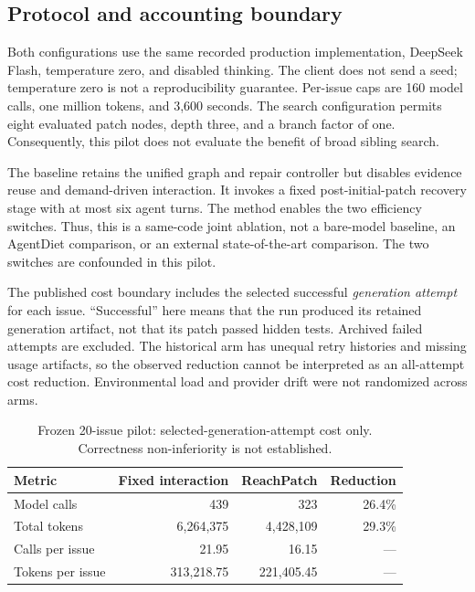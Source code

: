 \documentclass[acmsmall,screen,review,anonymous]{acmart}
\newcommand{\system}{ReachPatch}
\begin{document}
\subsection{Protocol and accounting boundary}
Both configurations use the same recorded production implementation, DeepSeek Flash, temperature zero, and disabled thinking. The client does not send a seed; temperature zero is not a reproducibility guarantee. Per-issue caps are 160 model calls, one million tokens, and 3,600 seconds. The search configuration permits eight evaluated patch nodes, depth three, and a branch factor of one. Consequently, this pilot does not evaluate the benefit of broad sibling search.

The baseline retains the unified graph and repair controller but disables evidence reuse and demand-driven interaction. It invokes a fixed post-initial-patch recovery stage with at most six agent turns. The method enables the two efficiency switches. Thus, this is a same-code joint ablation, not a bare-model baseline, an AgentDiet comparison, or an external state-of-the-art comparison. The two switches are confounded in this pilot.

The published cost boundary includes the selected successful \emph{generation attempt} for each issue. ``Successful'' here means that the run produced its retained generation artifact, not that its patch passed hidden tests. Archived failed attempts are excluded. The historical arm has unequal retry histories and missing usage artifacts, so the observed reduction cannot be interpreted as an all-attempt cost reduction. Environmental load and provider drift were not randomized across arms.

\begin{table}[t]
\caption{Frozen 20-issue pilot: selected-generation-attempt cost only. Correctness non-inferiority is not established.}
\label{tab:pilot}
\begin{tabular}{@{}lrrr@{}}
\toprule
Metric & Fixed interaction & \system{} & Reduction \\
\midrule
Model calls & 439 & 323 & 26.4\% \\
Total tokens & 6,264,375 & 4,428,109 & 29.3\% \\
Calls per issue & 21.95 & 16.15 & --- \\
Tokens per issue & 313,218.75 & 221,405.45 & --- \\
\bottomrule
\end{tabular}
\end{table}
\end{document}
